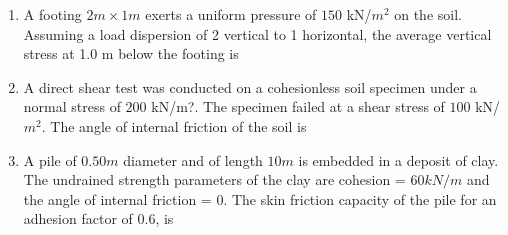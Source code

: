 \documentclass[journal]{IEEEtran}
\begin{document}
\begin{enumerate}
\begin{enumerate}
\end{enumerate}

\item A footing $2 m \times 1 m$ exerts a uniform pressure of $150$ kN/$m^{2}$ on the soil. Assuming a load
dispersion of 2 vertical to 1 horizontal, the average vertical stress  at 1.0 m below the
footing is \hfill {}

\begin{enumerate}
\end{enumerate}

\item A direct shear test was conducted on a cohesionless soil  specimen under a normal stress of $200$ kN/m?. The specimen failed at a shear stress of $100$ kN/$m^{2}$. The angle of internal friction of the soil  is \hfill {}

\begin{enumerate}
\end{enumerate}

\item A pile of $0.50 m$ diameter and of length $10 m$ is embedded in a deposit of clay. The undrained strength parameters of the clay are cohesion = $60 kN/m$ and the angle of internal friction = $0$. The skin friction capacity  of the pile for an adhesion factor of $0.6$, is \hfill {}


\end{enumerate}
\end{document}
